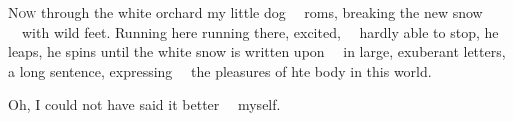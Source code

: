 
\begin{poem}
\begin{stanza}
\textsc{Now} through the white orchard my little dog\verseline
~~roms, breaking the new snow\verseline
~~with wild feet.\verseline
Running here running there, excited,\verseline
~~hardly able to stop, he leaps, he spins\verseline
until the white snow is written upon\verseline
~~in large, exuberant letters,\verseline
a long sentence, expressing\verseline
~~the pleasures of hte body in this world.
\end{stanza}

\begin{stanza}
Oh, I could not have said it better\verseline
~~myself.
\end{stanza}
\end{poem}